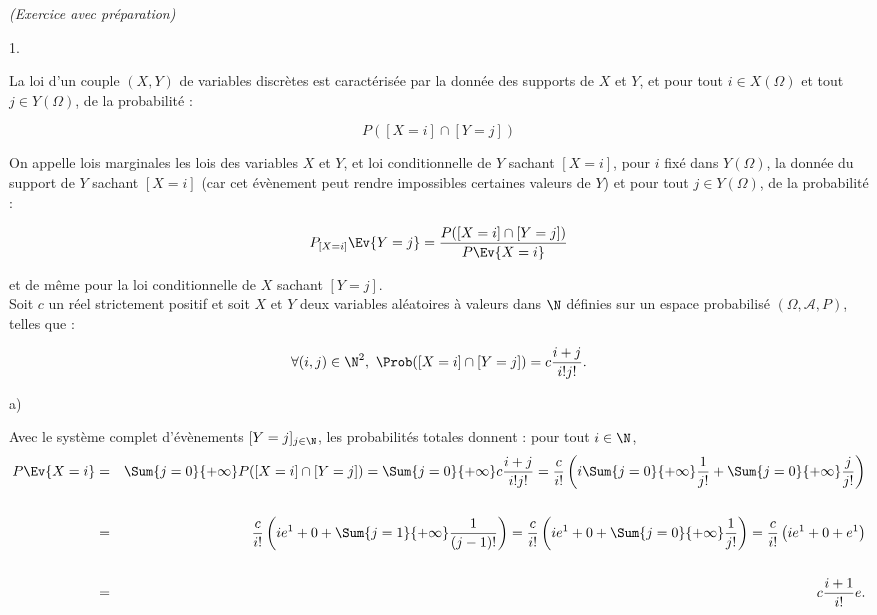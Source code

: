 \documentclass[11pt]{article}%
\begin{document}
 \begin{exercice}{\it (Exercice avec préparation)}~
 \begin{noliste}{1.}
 \setlength{\itemsep}{4mm}
 \item La loi d'un couple $(X,Y)$ de variables discrètes est
caractérisée par la donnée des supports de $X$ et $Y$, et pour tout $i
\in X ( \Omega)$ et tout $j \in Y ( \Omega)$, de la probabilité : 
 
\[
 P ( [X = i] \cap [Y = j] ) 
\]

 On appelle lois marginales les lois des variables $X$ et $Y$, et loi
conditionnelle de $Y$ sachant $[X = i]$, pour $i$ fixé dans $Y ( \Omega
)$, la donnée du support de $Y$ sachant $[X = i]$ (car cet évènement
peut rendre impossibles certaines valeurs de $Y$) et pour tout $j \in Y
( \Omega)$, de la probabilité : 
 
\[
 P_{ [X = i] } \Ev{ Y = j } = \frac{ P ( [X = i] \cap [Y = j] ) }{ P
\Ev{X = i } } 
\]

 et de même pour la loi conditionnelle de $X$ sachant $[Y = j]$. \\

 Soit $c$ un réel strictement positif et soit $X$ et $Y$ deux variables
aléatoires à valeurs dans $\N$ définies sur un espace probabilisé
$(\Omega, \mathcal{A}, P)$, telles que : 
 
\[
 \forall (i,j) \in \N^{2}, \ \Prob( [ X = i ] \cap [ Y = j ] ) = c
\frac{ i + j }{ i! j! }. 
\]

 \item \begin{noliste}{a)}
 \setlength{\itemsep}{2mm}

 \item Avec le système complet d'évènements $[Y = j]_{ j \in \N}$, les
probabilités totales donnent : pour tout $i \in \N$,
\begin{eqnarray*}
  P \Ev{ X = i } & = & \Sum{j = 0}{+ \infty} P ( [X = i ] \cap [Y = j] )
  = \Sum{j = 0}{+ \infty} c \frac{ i + j }{ i! j! } = \frac{ c }{ i! }
  \left( i \Sum{j = 0}{+ \infty} \frac{ 1 }{ j! } + \Sum{j = 0}{+ \infty}
    \frac{ j }{ j! } \right) \\
  \\
  & = & \frac{ c }{ i! } \left( i e^{1} + 0 + \Sum{j = 1}{+ \infty}
    \frac{ 1 }{ (j-1)! } \right) = \frac{ c }{ i! } \left( i e^{1} + 0 +
    \Sum{j = 0}{+ \infty} \frac{ 1 }{ j! } \right) = \frac{ c }{ i! }
  \left( i e^{1} + 0 + e^{1} \right) \\
  \\
  & = & c \frac{ i + 1 }{ i! } e. 
\end{eqnarray*}



\end{noliste}
\end{noliste}
\end{exercice}
\end{document}
